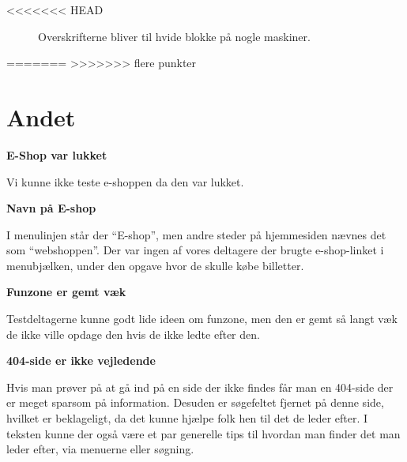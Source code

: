 \documentclass[10pt,a4paper]{article}      %
\newcommand\pic[1]{\texttt{[image: Pics/\#1]}}
\renewcommand\smallproblem{\pic{smallproblem}}
\renewcommand\criticalproblem{\pic{criticalproblem}}
\begin{document}
<<<<<<< HEAD
\begin{figure}[htbp]
    \centering
    \caption{Overskrifterne bliver til hvide blokke på nogle maskiner.}
    \label{fig:hvideblokke}
\end{figure}

=======
>>>>>>> flere punkter
\section{Andet}
\begin{kommentarer}

\item[\criticalproblem]{\textbf{E-Shop var lukket}}

Vi kunne ikke teste e-shoppen da den var lukket.

\item[\smallproblem]{\textbf{Navn på E-shop}}

I menulinjen står der ``E-shop'', men andre steder på hjemmesiden nævnes det som
``webshoppen''. Der var ingen af vores deltagere der brugte e-shop-linket i
menubjælken, under den opgave hvor de skulle købe billetter.

\item[\smallproblem]{\textbf{Funzone er gemt væk}}

Testdeltagerne kunne godt lide ideen om funzone, men den er gemt så langt væk de ikke ville opdage den hvis de ikke ledte efter den.

\item[\smallproblem]{\textbf{404-side er ikke vejledende}}

Hvis man prøver på at gå ind på en side der ikke findes får man en 404-side der er meget sparsom på information. Desuden er søgefeltet fjernet på denne side, hvilket er beklageligt, da det kunne hjælpe folk hen til det de leder efter. I teksten kunne der også være et par generelle tips til hvordan man finder det man leder efter, via menuerne eller søgning. 

\end{kommentarer}
\end{document}
